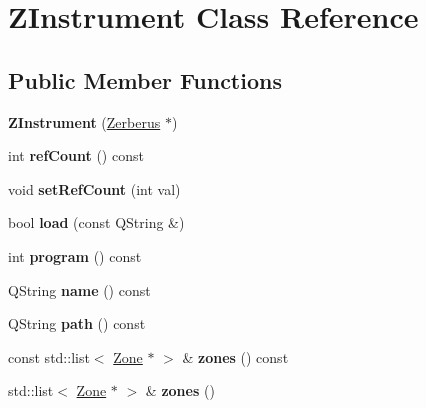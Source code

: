 \hypertarget{class_z_instrument}{}\section{Z\+Instrument Class Reference}
\label{class_z_instrument}
\subsection*{Public Member Functions}
\begin{DoxyCompactItemize}
\item 
\mbox{\label{class_z_instrument_ae3c01b4b90a147c1e466b75bdd21afb9}} 
{\bfseries Z\+Instrument} (\hyperlink{class_zerberus}{Zerberus} $\ast$)
\item 
\mbox{\label{class_z_instrument_a570eb64ee6cf833701108be6abec7584}} 
int {\bfseries ref\+Count} () const
\item 
\mbox{\label{class_z_instrument_a28f23cae9c734aa7b6aa15f69a2f312d}} 
void {\bfseries set\+Ref\+Count} (int val)
\item 
\mbox{\label{class_z_instrument_a48cad5adcca4f25f9c94270ac364c885}} 
bool {\bfseries load} (const Q\+String \&)
\item 
\mbox{\label{class_z_instrument_a8b9a007e194ca2718fd25ded6979d1e7}} 
int {\bfseries program} () const
\item 
\mbox{\label{class_z_instrument_aa0097743ee7f8f0bbd9eccf9cb5c6f85}} 
Q\+String {\bfseries name} () const
\item 
\mbox{\label{class_z_instrument_ab2c149a7706f01ba2869b8f4b1c16c49}} 
Q\+String {\bfseries path} () const
\item 
\mbox{\label{class_z_instrument_a26ebdbb7146d29f9ef071da7a8c2ae67}} 
const std\+::list$<$ \hyperlink{struct_zone}{Zone} $\ast$ $>$ \& {\bfseries zones} () const
\item 
\mbox{\label{class_z_instrument_af4f833c4486f597e4d38abf8e1465dc9}} 
std\+::list$<$ \hyperlink{struct_zone}{Zone} $\ast$ $>$ \& {\bfseries zones} ()

\end{DoxyCompactItemize}

